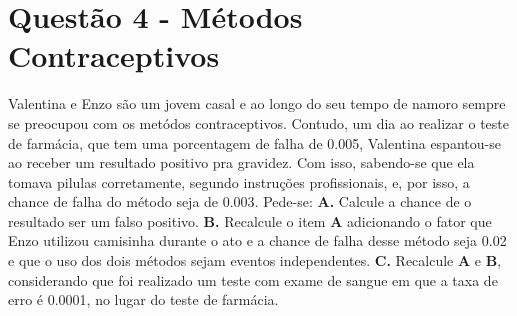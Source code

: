 \documentclass[a4paper, 12pt]{article}
\begin{document}
\section*{Questão 4 - Métodos Contraceptivos}
\large {Valentina e Enzo são um jovem casal e ao longo do seu tempo de namoro sempre se preocupou com os metódos contraceptivos. Contudo, um dia ao realizar o teste de farmácia, que tem uma porcentagem de falha de 0.005, Valentina espantou-se ao receber um resultado positivo pra gravidez. Com isso, sabendo-se que ela tomava pilulas corretamente, segundo instruções profissionais, e, por isso, a chance de falha do método seja de 0.003. Pede-se:}
\newline
\newline
\textbf{A.}  Calcule a chance de o resultado ser um falso positivo.
\newline
\newline
\textbf{B.} Recalcule o item \textbf{A} adicionando o fator que Enzo utilizou camisinha durante o ato e a chance de falha desse método seja 0.02 e que o uso dos dois métodos sejam eventos independentes.
\newline
\newline
\textbf{C.}  Recalcule \textbf{A} e \textbf{B}, considerando que foi realizado um teste com exame de sangue em que a taxa de erro é 0.0001, no lugar do teste de farmácia.
\end{document}
